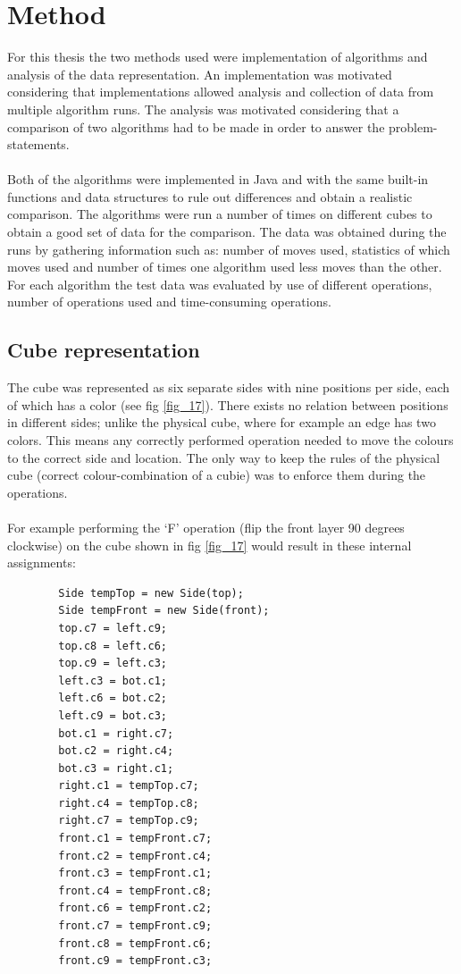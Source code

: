 \documentclass[a4paper,11pt]{kth-mag}
\begin{document}
\chapter{Method}
For this thesis the two methods used were implementation of algorithms and analysis of the data representation. An implementation was motivated considering that implementations allowed analysis and collection of data from multiple algorithm runs. The analysis was motivated considering that a comparison of two algorithms had to be made in order to answer the problem-statements.\\\\
Both of the algorithms were implemented in Java and with the same built-in functions and data structures to rule out differences and obtain a realistic comparison.
The algorithms were run a number of times on different cubes to obtain a good set of data for the comparison. The data was obtained during the runs by gathering information such as: number of moves used, statistics of which moves used and number of times one algorithm used less moves than the other.  
For each algorithm the test data was evaluated by use of different operations, number of operations used and time-consuming operations.


\section{Cube representation}
 The cube was represented as six separate sides with nine positions per side, each of which has a color (see fig \ref{fig_17}). There exists no relation between positions in different sides; unlike the physical cube, where for example an edge has two colors. This means any correctly performed operation needed to move the colours to the correct side and location. The only way to keep the rules of the physical cube (correct colour-combination of a cubie) was to enforce them during the operations.\\\\
 For example performing the `F' operation (flip the front layer 90 degrees clockwise) on the cube shown in fig \ref{fig_17} would result in these internal assignments:
 \begin{verbatim}
		Side tempTop = new Side(top);
		Side tempFront = new Side(front);
		top.c7 = left.c9;
		top.c8 = left.c6;
		top.c9 = left.c3;
		left.c3 = bot.c1;
		left.c6 = bot.c2;
		left.c9 = bot.c3;
		bot.c1 = right.c7;
		bot.c2 = right.c4;
		bot.c3 = right.c1;
		right.c1 = tempTop.c7;
		right.c4 = tempTop.c8;
		right.c7 = tempTop.c9;
		front.c1 = tempFront.c7;
		front.c2 = tempFront.c4;
		front.c3 = tempFront.c1;
		front.c4 = tempFront.c8;
		front.c6 = tempFront.c2;
		front.c7 = tempFront.c9;
		front.c8 = tempFront.c6;
		front.c9 = tempFront.c3;
\end{verbatim}
\end{document}
